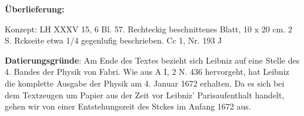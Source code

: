       
               
                \begin{ledgroupsized}[r]{120mm}
                \footnotesize 
                \pstart                
                \noindent\textbf{\"{U}berlieferung:}   
                \pend
                \end{ledgroupsized}
            
              
                            \begin{ledgroupsized}[r]{114mm}
                            \footnotesize 
                            \pstart \parindent -6mm
                            Konzept: LH XXXV 15, 6 Bl. 57. Rechteckig beschnittenes Blatt, 10 x 20 cm. 2 S. Rckseite etwa 1/4 gegenlufig beschrieben. Cc 1, Nr. 193 J \pend
                            \end{ledgroupsized}
                \vspace*{5mm}
                \begin{ledgroup}
                \footnotesize 
                \pstart
            \noindent\footnotesize{\textbf{Datierungsgr\"{u}nde}: Am Ende des Textes bezieht sich Leibniz auf eine Stelle des 4. Bandes der Physik von Fabri. Wie aus A I, 2 N. 436 hervorgeht, hat Leibniz die komplette Ausgabe der Physik am 4. Januar 1672 erhalten. Da es sich bei dem Textzeugen um Papier aus der Zeit vor Leibniz' Parisaufenthalt handelt, gehen wir von einer Entstehungszeit des Stckes im Anfang 1672 aus.}
                \pend
                \end{ledgroup}
            
